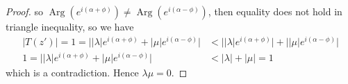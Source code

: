 \documentclass{article}
\theoremstyle{definition}
\numberwithin{lemma}{problem}
\numberwithin{equation}{problem}
\newcommand{\abs}[1]{\left\lvert #1\right\rvert}
\DeclareMathOperator\Arg{Arg}
\begin{document}
\begin{proof}
    so $\Arg(e^{i(\alpha+\phi)}) \ne \Arg(e^{i(\alpha-\phi)})$,
    then equality does not hold in triangle inequality, so we have
    \begin{align*}
        \abs{T(z')} = 1 = \bigl\lvert \abs\lambda e^{i(\alpha+\phi)} + \abs\mu e^{i(\alpha-\phi)} \bigr\rvert
        &< \bigl\lvert \abs\lambda e^{i(\alpha+\phi)} \bigr\rvert +
        \bigl\lvert \abs\mu e^{i(\alpha-\phi)} \bigr\rvert  \\
        1 = \bigl\lvert \abs\lambda e^{i(\alpha+\phi)} + \abs\mu e^{i(\alpha-\phi)} \bigr\rvert
        &< \abs\lambda + \abs\mu = 1
    \end{align*}
    which is a contradiction.
    Hence $\lambda\mu = 0$.
%

\end{proof}
\end{document}
